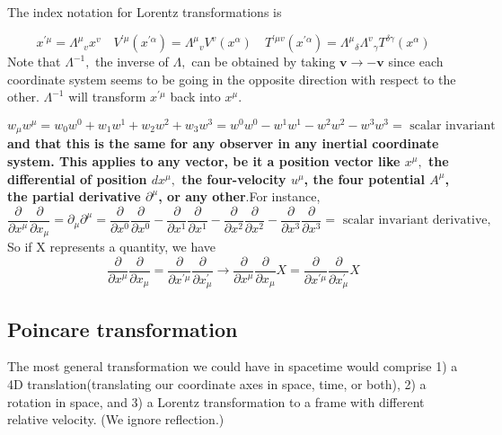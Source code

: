 The index notation for Lorentz transformations is 
\begin{qt}
    \begin{equation}
x^{\prime \mu}=\Lambda^{\mu}{}_{v} x^{v} \quad V^{\prime \mu}\left(x^{\prime \alpha}\right)=\Lambda^{\mu}{}_{v} V^{v}\left(x^{\alpha}\right) \quad T^{\prime \mu v}\left(x^{\prime \alpha}\right)=\Lambda^{\mu}{}_{\delta} \Lambda^{v}{}_{\gamma} T^{\delta \gamma}\left(x^{\alpha}\right)
\end{equation}
Note that $\Lambda^{-1},$ the inverse of $\Lambda,$ can be obtained by taking $\mathbf{v} \rightarrow-\mathbf{v}$ since each coordinate system seems to be going in the opposite direction with respect to the other. $\Lambda^{-1}$ will transform $x^{\prime \mu}$ back into $x^{\mu}$.
\end{qt}
$$
w_{\mu} w^{\mu}=w_{0} w^{0}+w_{1} w^{1}+w_{2} w^{2}+w_{3} w^{3}=w^{0} w^{0}-w^{1} w^{1}-w^{2} w^{2}-w^{3} w^{3}=\text { scalar invariant }
$$
\textbf{and that this is the same for any observer in any inertial coordinate system. This applies to any
vector, be it a position vector like $x^{\mu},$ the differential of position $d x^{\mu},$ the four-velocity $u^{\mu}$, the four potential $A^{\mu}$, the partial derivative $\partial^{\mu}$, or any other}.For instance,
$$
\frac{\partial}{\partial x^{\mu}} \frac{\partial}{\partial x_{\mu}}=\partial_{\mu} \partial^{\mu}=\frac{\partial}{\partial x^{0}} \frac{\partial}{\partial x^{0}}-\frac{\partial}{\partial x^{1}} \frac{\partial}{\partial x^{1}}-\frac{\partial}{\partial x^{2}} \frac{\partial}{\partial x^{2}}-\frac{\partial}{\partial x^{3}} \frac{\partial}{\partial x^{3}}=\text { scalar invariant derivative, }
$$
So if X represents a quantity, we have
$$
\frac{\partial}{\partial x^{\mu}} \frac{\partial}{\partial x_{\mu}}=\frac{\partial}{\partial x^{\prime \mu}} \frac{\partial}{\partial x_{\mu}^{\prime}} \rightarrow \frac{\partial}{\partial x^{\mu}} \frac{\partial}{\partial x_{\mu}} X=\frac{\partial}{\partial x^{\prime\mu}} \frac{\partial}{\partial x_{\mu}^{\prime}} X
$$
\subsection{Poincare transformation}
The most general transformation we could have in spacetime would comprise 1) a 4D translation(translating our coordinate axes in space, time, or both), 2) a rotation in space, and 3) a Lorentz transformation to a frame with different relative velocity. (We ignore reflection.)

